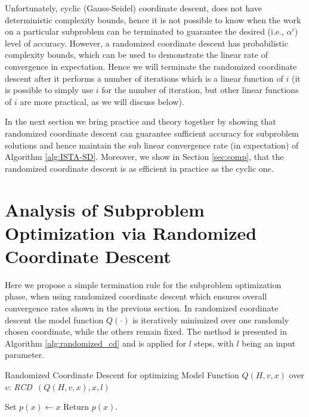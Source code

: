 \documentclass[11pt]{article}
\numberwithin{equation}{section}
\begin{document}
Unfortunately,  cyclic (Gauss-Seidel) coordinate descent, does not have deterministic complexity bounds, hence it is not possible to know when the work on a particular subproblem can be terminated to guarantee the desired (i.e.,  $\alpha^i$) level of accuracy. However, a randomized coordinate descent has probabilistic complexity bounds, which can be used to demonstrate the linear rate of convergence in expectation. Hence we will terminate the randomized coordinate descent after it performs a number of iterations which is a linear function of $i$ (it is possible to simply use $i$ for the number of iteration, but other linear functions of $i$ are more practical, as we will discuss below). 

In the next section we bring practice and theory together by showing that randomized coordinate descent can guarantee sufficient accuracy for subproblem solutions and hence maintain the sub linear convergence rate (in expectation) of Algorithm \ref{alg:ISTA-SD}. Moreover, we show in Section \ref{sec:comp}, that the randomized coordinate descent is as efficient in practice as the cyclic one. 


\section{Analysis of Subproblem Optimization via Randomized Coordinate Descent} %
\label{sec:coordinate_descent_iteration_complexity}
Here we propose a simple termination rule for the subproblem optimization phase,  when using randomized coordinate descent  which ensures overall convergence rates shown in the previous section.  In randomized coordinate descent the model function $Q(\cdot)$ is iteratively minimized over one randomly chosen coordinate, while the others remain fixed. 
The method  is presented in Algorithm \ref{alg:randomized_cd} and is applied for $l$ steps, with $l$ being an input parameter. 

\begin{algorithm2e}\caption{Randomized Coordinate Descent for optimizing Model Function $Q(H, v, x)$ over $v$: {\em RCD\ }$(Q(H, v, x), x, l)$ }
    \label{alg:randomized_cd}%
Set $p(x) \gets x $\; 
Return $p(x)$.
\end{algorithm2e}
\end{document}
